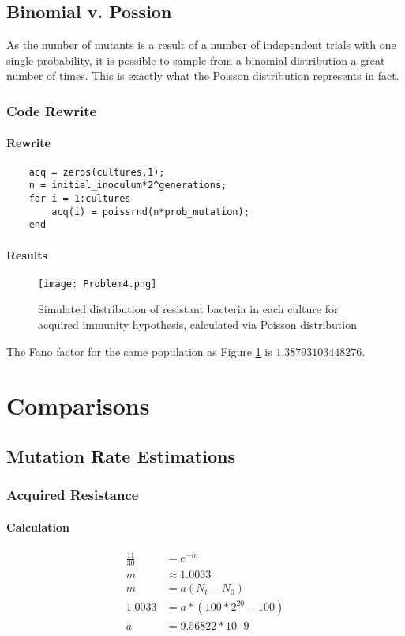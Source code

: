 \documentclass[titlepage]{scrreprt}
\begin{document}
\section{Binomial v. Possion}
As the number of mutants is a result of a number of independent trials with one single probability, it is possible to sample from a binomial distribution a great number of times.  This is exactly what the Poisson distribution represents in fact.
\subsection{Code Rewrite}
\subsubsection{Rewrite}
\begin{verbatim}
    acq = zeros(cultures,1);
    n = initial_inoculum*2^generations;
    for i = 1:cultures
        acq(i) = poissrnd(n*prob_mutation);
    end
\end{verbatim}
\subsubsection{Results}
\begin{figure}[H]
    \centering
    \texttt{[image: Problem4.png]}
    \caption{Simulated distribution of resistant bacteria in each culture for acquired immunity hypothesis, calculated via Poisson distribution}
    \label{fig:problem4_histogram}
\end{figure}
The Fano factor for the same population as Figure \ref{fig:problem4_histogram} is $1.38793103448276$.
\chapter{Comparisons}
\section{Mutation Rate Estimations}
\subsection{Acquired Resistance}
\subsubsection{Calculation}
\begin{equation*}
\begin{split}
    \frac{11}{30} &= e^{-m} \\
    m &\approx 1.0033 \\
    m &= a(N_t-N_0) \\
    1.0033 &= a*(100*2^{20}-100) \\
    a &= 9.56822*10^-9
\end{split}
\end{equation*}
\end{document}
